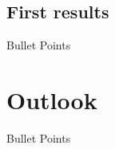 \documentclass[aspectratio=169]{beamer}
\begin{document}
\subsection{First results}
\begin{frame}{Bullet Points}

\end{frame}

\section{Outlook}
\begin{frame}{Bullet Points}

\end{frame}
\end{document}
